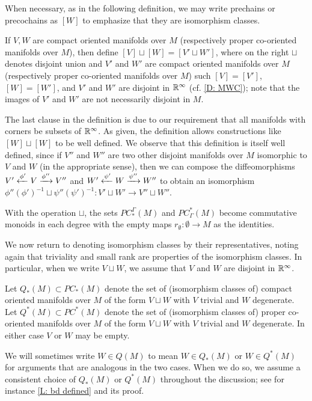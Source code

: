 When necessary, as in the following definition, we may write prechains or precochains as $[W]$ to emphasize that they are isomorphism classes.

\begin{definition}\label{D: prechain sum}
	If $V,W$ are compact oriented manifolds over $M$ (respectively proper co-oriented manifolds over $M$), then define $[V] \sqcup [W] = [V' \sqcup W']$, where on the right $\sqcup$ denotes disjoint union and $V'$ and $W'$ are compact oriented manifolds over $M$ (respectively proper co-oriented manifolds over $M$) such $[V]=[V']$, $[W]=[W']$, and $V'$ and $W'$ are disjoint in $\mathbb{R}^\infty$ (cf.
	\cref{D: MWC}); note that the images of $V'$ and $W'$ are not necessarily disjoint in $M$.
\end{definition}

The last clause in the definition is due to our requirement that all manifolds with corners be subsets of $\mathbb{R}^\infty$.
As given, the definition allows constructions like $[W]\sqcup[W]$ to be well defined.
We observe that this definition is itself well defined, since if $V''$ and $W''$ are two other disjoint manifolds over $M$ isomorphic to $V$ and $W$ (in the appropriate sense), then we can compose the diffeomorphisms $V'\xleftarrow{\phi'}V \xrightarrow{\phi''} V''$ and $W'\xleftarrow{\psi'}W \xrightarrow{\psi''} W''$ to obtain an isomorphism $\phi''(\phi')^{-1} \sqcup \psi''(\psi')^{-1} \colon V' \sqcup W' \to V'' \sqcup W''$.

With the operation $\sqcup$, the sets $PC^\Gamma_*(M)$ and $PC_\Gamma^*(M)$ become commutative monoids in each degree with the empty maps $r_\emptyset \colon \emptyset \to M$ as the identities.

We now return to denoting isomorphism classes by their representatives, noting again that triviality and small rank are properties of the isomorphism classes.
In particular, when we write $V \sqcup W$, we assume that $V$ and $W$ are disjoint in $\mathbb{R}^\infty$.

\begin{definition}
	Let $Q_*(M) \subset PC_*(M)$ denote the set of (isomorphism classes of) compact oriented manifolds over $M$ of the form $V \sqcup W$ with $V$ trivial and $W$ degenerate.
	Let $Q^*(M) \subset PC^*(M)$ denote the set of (isomorphism classes of) proper co-oriented manifolds over $M$ of the form $V \sqcup W$ with $V$ trivial and $W$ degenerate.
	In either case $V$ or $W$ may be empty.

	We will sometimes write $W \in Q(M)$ to mean $W \in Q_*(M)$ or $W \in Q^*(M)$ for arguments that are analogous in the two cases.
	When we do so, we assume a consistent choice of $Q_*(M)$ or $Q^*(M)$ throughout the discussion; see for instance \cref{L: bd defined} and its proof.
\end{definition}

